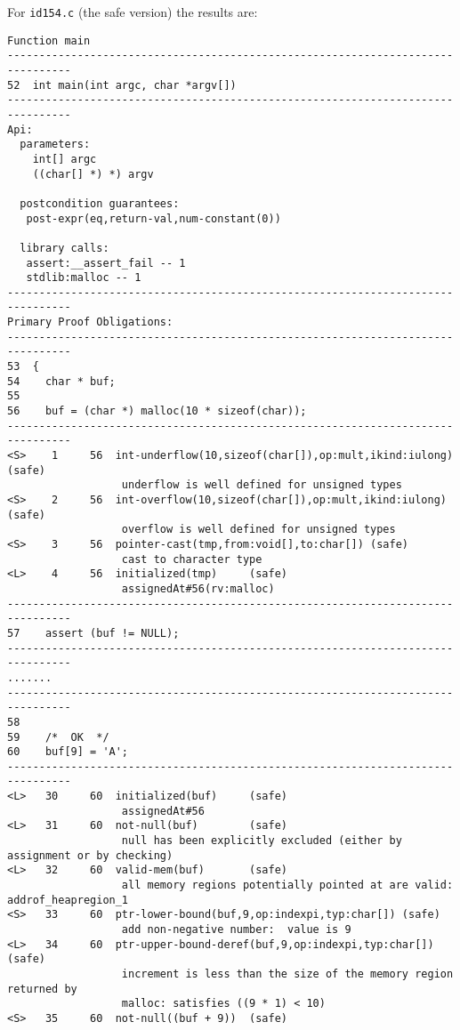 \documentclass[11pt]{article}
\begin{document}
For {\tt id154.c} (the safe version) the results are:
\begin{scriptsize}
\begin{verbatim}
Function main
--------------------------------------------------------------------------------
52  int main(int argc, char *argv[])
--------------------------------------------------------------------------------
Api:
  parameters:
    int[] argc
    ((char[] *) *) argv

  postcondition guarantees:
   post-expr(eq,return-val,num-constant(0))

  library calls:
   assert:__assert_fail -- 1
   stdlib:malloc -- 1
--------------------------------------------------------------------------------
Primary Proof Obligations:
--------------------------------------------------------------------------------
53  {
54    char * buf;
55
56    buf = (char *) malloc(10 * sizeof(char));
--------------------------------------------------------------------------------
<S>    1     56  int-underflow(10,sizeof(char[]),op:mult,ikind:iulong) (safe)
                  underflow is well defined for unsigned types
<S>    2     56  int-overflow(10,sizeof(char[]),op:mult,ikind:iulong) (safe)
                  overflow is well defined for unsigned types
<S>    3     56  pointer-cast(tmp,from:void[],to:char[]) (safe)
                  cast to character type
<L>    4     56  initialized(tmp)     (safe)
                  assignedAt#56(rv:malloc)
--------------------------------------------------------------------------------
57    assert (buf != NULL);
--------------------------------------------------------------------------------
.......
--------------------------------------------------------------------------------
58
59    /*  OK  */
60    buf[9] = 'A';
--------------------------------------------------------------------------------
<L>   30     60  initialized(buf)     (safe)
                  assignedAt#56
<L>   31     60  not-null(buf)        (safe)
                  null has been explicitly excluded (either by assignment or by checking)
<L>   32     60  valid-mem(buf)       (safe)
                  all memory regions potentially pointed at are valid: addrof_heapregion_1
<S>   33     60  ptr-lower-bound(buf,9,op:indexpi,typ:char[]) (safe)
                  add non-negative number:  value is 9
<L>   34     60  ptr-upper-bound-deref(buf,9,op:indexpi,typ:char[]) (safe)
                  increment is less than the size of the memory region returned by 
                  malloc: satisfies ((9 * 1) < 10)
<S>   35     60  not-null((buf + 9))  (safe)

\end{verbatim}
\end{scriptsize}
\end{document}
